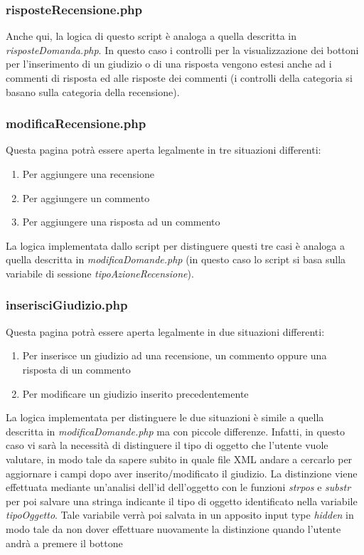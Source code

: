 \documentclass [a4paper, 12pt]{book}
\begin{document}
\subsubsection{risposteRecensione.php}
Anche qui, la logica di questo script è analoga a quella descritta in \textit{risposteDomanda.php}. In questo caso i controlli per la visualizzazione dei bottoni per l'inserimento di un giudizio o di una risposta vengono estesi anche ad i commenti di risposta ed alle risposte dei commenti (i controlli della categoria si basano sulla categoria della recensione).

\subsubsection{modificaRecensione.php}
Questa pagina potrà essere aperta legalmente in tre situazioni differenti:
\begin{enumerate}
\item Per aggiungere una recensione
\item Per aggiungere un commento
\item Per aggiungere una risposta ad un commento
\end{enumerate}
La logica implementata dallo script per distinguere questi tre casi è analoga a quella descritta in \textit{modificaDomande.php} (in questo caso lo script si basa sulla variabile di sessione \textit{tipoAzioneRecensione}).

\subsubsection{inserisciGiudizio.php}
Questa pagina potrà essere aperta legalmente in due situazioni differenti:
\begin{enumerate}
\item Per inserisce un giudizio ad una recensione, un commento oppure una risposta di un commento
\item Per modificare un giudizio inserito precedentemente
\end{enumerate}
La logica implementata per distinguere le due situazioni è simile a quella descritta in \textit{modificaDomande.php} ma con piccole differenze. Infatti, in questo caso vi sarà la necessità di distinguere il tipo di oggetto che l'utente vuole valutare, in modo tale da sapere subito in quale file XML andare a cercarlo per aggiornare i campi dopo aver inserito/modificato il giudizio. La distinzione viene effettuata mediante un'analisi dell'id dell'oggetto con le funzioni \textit{strpos} e \textit{substr} per poi salvare una stringa indicante il tipo di oggetto identificato nella variabile \textit{tipoOggetto}. Tale variabile verrà poi salvata in un apposito input type \textit{hidden} in modo tale da non dover effettuare nuovamente la distinzione quando l'utente andrà a premere il bottone
\end{document}
